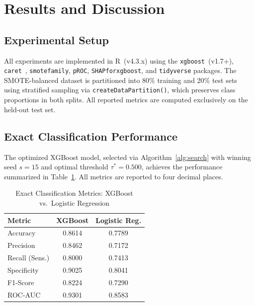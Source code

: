 \documentclass[10pt, conference, letterpaper]{IEEEtran}
\begin{document}
\section{Results and Discussion}
\label{sec:results}

\subsection{Experimental Setup}

All experiments are implemented in R~(v4.3.x) using the \texttt{xgboost}~(v1.7+), \texttt{caret}~\cite{kuhn2008caret}, \texttt{smotefamily}, \texttt{pROC}, \texttt{SHAPforxgboost}, and \texttt{tidyverse} packages. The SMOTE-balanced dataset is partitioned into 80\% training and 20\% test sets using stratified sampling via \texttt{createDataPartition()}, which preserves class proportions in both splits. All reported metrics are computed exclusively on the held-out test set.

\subsection{Exact Classification Performance}

The optimized XGBoost model, selected via Algorithm~\ref{alg:search} with winning seed $s{=}15$ and optimal threshold $\tau^*{=}0.500$, achieves the performance summarized in Table~\ref{tab:results}. All metrics are reported to four decimal places.

\begin{table}[htbp]
\caption{Exact Classification Metrics: XGBoost vs.\ Logistic Regression}
\label{tab:results}
\begin{center}
\begin{tabular}{@{}lcc@{}}
\toprule
\textbf{Metric} & \textbf{XGBoost} & \textbf{Logistic Reg.} \\
\midrule
Accuracy       & 0.8614 & 0.7789 \\
Precision      & 0.8462 & 0.7172 \\
Recall (Sens.) & 0.8000 & 0.7413 \\
Specificity    & 0.9025 & 0.8041 \\
F1-Score       & 0.8224 & 0.7290 \\
ROC-AUC        & 0.9301 & 0.8583 \\
\bottomrule
\end{tabular}
\end{center}
\end{table}
\end{document}
